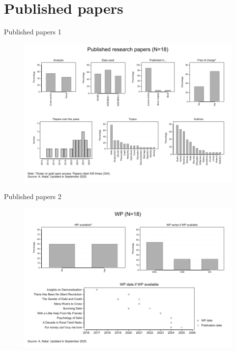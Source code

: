 \documentclass[aspectratio=169]{beamer}
\begin{document}
\section*{Published papers}
\begin{frame}
\label{published}


\end{frame}





\begin{frame}{Published papers 1}

\begin{figure}[h]
\centering
\includegraphics[width=0.7\columnwidth]{INPUT/PP_global}
\end{figure}

\end{frame}






\begin{frame}{Published papers 2}

\begin{figure}[h]
\centering
\includegraphics[width=0.7\columnwidth]{INPUT/PP_wp}
\end{figure}

\end{frame}
\end{document}
